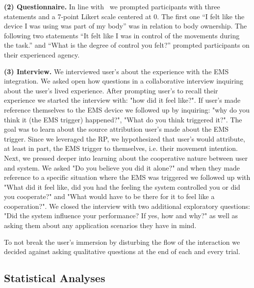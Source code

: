 \indent\textbf{(2) Questionnaire.}
In line with~\cite{Hornbaek} we prompted participants with three statements and a 7-point Likert scale centered at 0. The first one ``I felt like the device I was using was part of my body'' was in relation to body ownership. The following two statements ``It felt like I was in control of the movements during the task.'' and ``What is the degree of control you felt?'' prompted participants on their experienced agency.

\indent\textbf{(3) Interview.}
We interviewed user's about the experience with the EMS integration. We asked open how questions in a collaborative interview inquiring about the user's lived experience. After prompting user's to recall their experience we started the interview with: "how did it feel like?". If user's made reference themselves to the EMS device we followed up by inquiring: "why do you think it (the EMS trigger) happened?", "What do you think triggered it?". The goal was to learn about the source attribution user's made about the EMS trigger. Since we leveraged the RP, we hypothesized that user's would attribute, at least in part, the EMS trigger to themselves, i.e. their movement intention. Next, we pressed deeper into learning about the cooperative nature between user and system. We asked "Do you believe you did it alone?" and when they made reference to a specific situation where the EMS was triggered we followed up with "What did it feel like, did you had the feeling the system controlled you or did you cooperate?" and "What would have to be there for it to feel like a cooperation?". We closed the interview with two additional exploratory questions: "Did the system influence your performance? If yes, how and why?" as well as asking them about any application scenarios they have in mind. 

To not break the user's immersion by disturbing the flow of the interaction we decided against asking qualitative questions at the end of each and every trial.

\subsection{Statistical Analyses}



